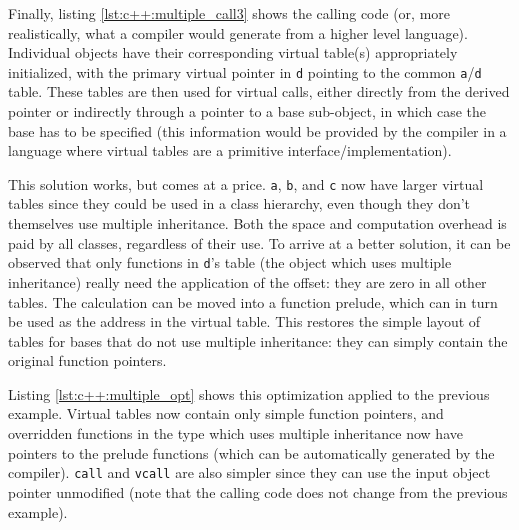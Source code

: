 \begin{figure}[ht]
    
\end{figure}

Finally, listing \ref{lst:c++:multiple_call3} shows the calling code (or, more
realistically, what a compiler would generate from a higher level language).
Individual objects have their corresponding virtual table(s) appropriately
initialized, with the primary virtual pointer in \texttt{d} pointing to the
common \texttt{a}/\texttt{d} table.  These tables are then used for virtual
calls, either directly from the derived pointer or indirectly through a pointer
to a base sub-object, in which case the base has to be specified (this
information would be provided by the compiler in a language where virtual tables
are a primitive interface/implementation).

This solution works, but comes at a price.  \texttt{a}, \texttt{b}, and
\texttt{c} now have larger virtual tables since they could be used in a class
hierarchy, even though they don't themselves use multiple inheritance.  Both the
space and computation overhead is paid by all classes, regardless of their use.
To arrive at a better solution, it can be observed that only functions in
\texttt{d}'s table (the object which uses multiple inheritance) really need the
application of the offset: they are zero in all other tables.  The calculation
can be moved into a function prelude, which can in turn be used as the address
in the virtual table.  This restores the simple layout of tables for bases that
do not use multiple inheritance: they can simply contain the original function
pointers.

Listing \ref{lst:c++:multiple_opt} shows this optimization applied to the
previous example.  Virtual tables now contain only simple function pointers, and
overridden functions in the type which uses multiple inheritance now have
pointers to the prelude functions (which can be automatically generated by the
compiler).  \texttt{call} and \texttt{vcall} are also simpler since they can use
the input object pointer unmodified (note that the calling code does not
change from the previous example).

\begin{figure}[ht]
    
\end{figure}
